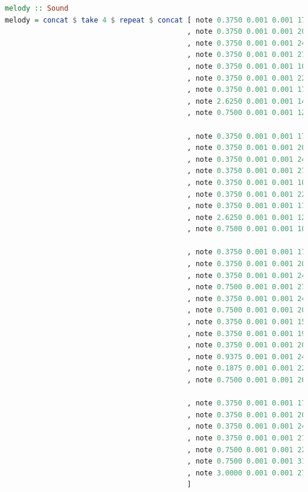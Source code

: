 \documentclass[11pt]{article}
\begin{document}
\begin{lstlisting}[language=Haskell, basicstyle=\tiny]
melody :: Sound
melody = concat $ take 4 $ repeat $ concat [ note 0.3750 0.001 0.001 17
                                           , note 0.3750 0.001 0.001 20
                                           , note 0.3750 0.001 0.001 24
                                           , note 0.3750 0.001 0.001 27
                                           , note 0.3750 0.001 0.001 10
                                           , note 0.3750 0.001 0.001 22
                                           , note 0.3750 0.001 0.001 17
                                           , note 2.6250 0.001 0.001 14
                                           , note 0.7500 0.001 0.001 12

                                           , note 0.3750 0.001 0.001 17
                                           , note 0.3750 0.001 0.001 20
                                           , note 0.3750 0.001 0.001 24
                                           , note 0.3750 0.001 0.001 27
                                           , note 0.3750 0.001 0.001 10
                                           , note 0.3750 0.001 0.001 22
                                           , note 0.3750 0.001 0.001 17
                                           , note 2.6250 0.001 0.001 12
                                           , note 0.7500 0.001 0.001 10

                                           , note 0.3750 0.001 0.001 17
                                           , note 0.3750 0.001 0.001 20
                                           , note 0.3750 0.001 0.001 24
                                           , note 0.7500 0.001 0.001 27
                                           , note 0.3750 0.001 0.001 24
                                           , note 0.7500 0.001 0.001 20
                                           , note 0.3750 0.001 0.001 15
                                           , note 0.3750 0.001 0.001 19
                                           , note 0.3750 0.001 0.001 20
                                           , note 0.9375 0.001 0.001 24
                                           , note 0.1875 0.001 0.001 22
                                           , note 0.7500 0.001 0.001 26

                                           , note 0.3750 0.001 0.001 17
                                           , note 0.3750 0.001 0.001 20
                                           , note 0.3750 0.001 0.001 24
                                           , note 0.3750 0.001 0.001 27
                                           , note 0.7500 0.001 0.001 22
                                           , note 0.7500 0.001 0.001 31
                                           , note 3.0000 0.001 0.001 27
                                           ]


\end{lstlisting}
\end{document}
